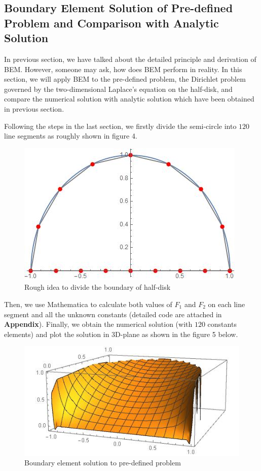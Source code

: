 \documentclass[a4paper,12pt]{article}
\begin{document}
\subsection{Boundary Element Solution of Pre-defined Problem and Comparison with Analytic Solution}
In previous section, we have talked about the detailed principle and derivation of BEM. However, someone may ask, how does BEM perform in reality. In this section, we will apply BEM to the pre-defined problem, the Dirichlet problem governed by the two-dimensional Laplace's equation on the half-disk, and compare the numerical solution with analytic solution which have been obtained in previous section. 

\par Following the steps in the last section, we firstly divide the semi-circle into $120$ line segments as roughly shown in figure 4.
\begin{figure}[H]
\centering
\includegraphics[scale=0.55]{segments.jpg}
\caption{Rough idea to divide the boundary of half-disk}
\end{figure}

Then, we use Mathematica to calculate both values of $F_1$ and $F_2$ on each line segment and all the unknown constants (detailed code are attached in \textbf{Appendix}). Finally, we obtain the numerical solution (with $120$ constants elements) and plot the solution in 3D-plane as shown in the figure 5 below.
\begin{figure}[H]
\centering
\includegraphics[scale=0.6]{BEM.jpg}
\caption{Boundary element solution to pre-defined problem}
\end{figure}
\end{document}
